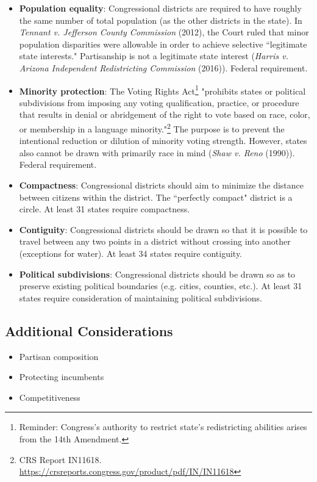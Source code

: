 \documentclass[10pt]{article}
\begin{document}
	\begin{itemize}
		\item \textbf{Population equality}: Congressional districts are required to have roughly the same number of total population (as the other districts in the state).  In \textit{Tennant v. Jefferson County Commission} (2012), the Court ruled that minor population disparities were allowable in order to achieve selective ``legitimate state interests." Partisanship is not a legitimate state interest (\textit{Harris v. Arizona Independent Redistricting Commission} (2016)). Federal requirement.
		\item \textbf{Minority protection}: The Voting Rights Act\footnote{Reminder: Congress's authority to restrict state's redistricting abilities arises from the 14th Amendment.} "prohibits states or political subdivisions from imposing any voting qualification, practice, or procedure that results in denial or abridgement of the right to vote based on race, color, or membership in a language minority."\footnote{CRS Report IN11618. \url{https://crsreports.congress.gov/product/pdf/IN/IN11618}} The purpose is to prevent the intentional reduction or dilution of minority voting strength. However, states also cannot be drawn with primarily race in mind (\textit{Shaw v. Reno} (1990)). Federal requirement.
		\item \textbf{Compactness}: Congressional districts should aim to minimize the distance between citizens within the district. The ``perfectly compact" district is a circle. At least 31 states require compactness.
		\item \textbf{Contiguity}: Congressional districts should be drawn so that it is possible to travel between any two points in a district without crossing into another (exceptions for water). At least 34 states require contiguity. 
		\item \textbf{Political subdivisions}: Congressional districts should be drawn so as to preserve existing political boundaries (e.g. cities, counties, etc.). At least 31 states require consideration of maintaining political subdivisions. 
	\end{itemize}
	
	\subsection{Additional Considerations}
	
	\begin{itemize}
		\item Partisan composition
		\item Protecting incumbents
		\item Competitiveness
	\end{itemize}
	
\end{document}
